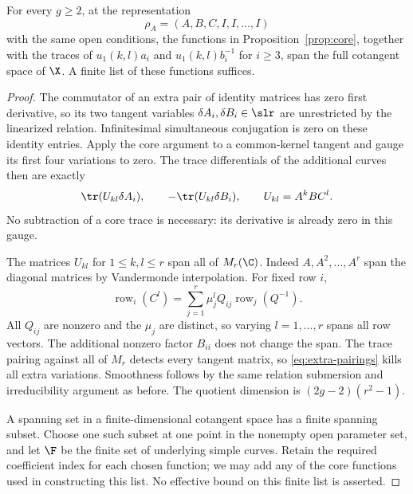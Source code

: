\begin{proposition}\label{prop:all-genus}
For every $g\geq2$, at the representation
\begin{equation}\label{eq:family}
 \rho_A=(A,B,C,I,I,\ldots,I)
\end{equation}
with the same open conditions, the functions in
Proposition~\ref{prop:core}, together with the traces of
$u_1(k,l)a_i$ and $u_1(k,l)b_i^{-1}$ for $i\geq3$, span the full
cotangent space of $\X$. A finite list of these functions suffices.
\end{proposition}
\begin{proof}
The commutator of an extra pair of identity matrices has zero first
derivative, so its two tangent variables $\delta A_i,\delta B_i\in\slr$
are unrestricted by the linearized relation. Infinitesimal simultaneous
conjugation is zero on these identity entries. Apply the core argument
to a common-kernel tangent and gauge its first four variations to zero.
The trace differentials of the additional curves then are exactly
\begin{equation}\label{eq:extra-pairings}
 \tr(U_{kl}\delta A_i),\qquad-\tr(U_{kl}\delta B_i),
 \qquad U_{kl}=A^kBC^l.
\end{equation}
No subtraction of a core trace is necessary: its derivative is already
zero in this gauge.

The matrices $U_{kl}$ for $1\leq k,l\leq r$ span all of $M_r(\C)$.
Indeed $A,A^2,\ldots,A^r$ span the diagonal matrices by Vandermonde
interpolation. For fixed row $i$,
\[
 \operatorname{row}_i(C^l)=
   \sum_{j=1}^r\mu_j^lQ_{ij}\operatorname{row}_j(Q^{-1}).
\]
All $Q_{ij}$ are nonzero and the $\mu_j$ are distinct, so varying
$l=1,\ldots,r$ spans all row vectors. The additional nonzero factor
$B_{ii}$ does not change the span. The trace pairing against all of
$M_r$ detects every tangent matrix, so \eqref{eq:extra-pairings} kills
all extra variations. Smoothness follows by the same relation
submersion and irreducibility argument as before. The quotient dimension
is $(2g-2)(r^2-1)$.

A spanning set in a finite-dimensional cotangent space has a finite
spanning subset. Choose one such subset at one point in the nonempty
open parameter set, and let $\F$ be the finite set of underlying simple
curves. Retain the required coefficient index for each chosen function;
we may add any of the core functions used in constructing this list.
No effective bound on this finite list is asserted.
\end{proof}
